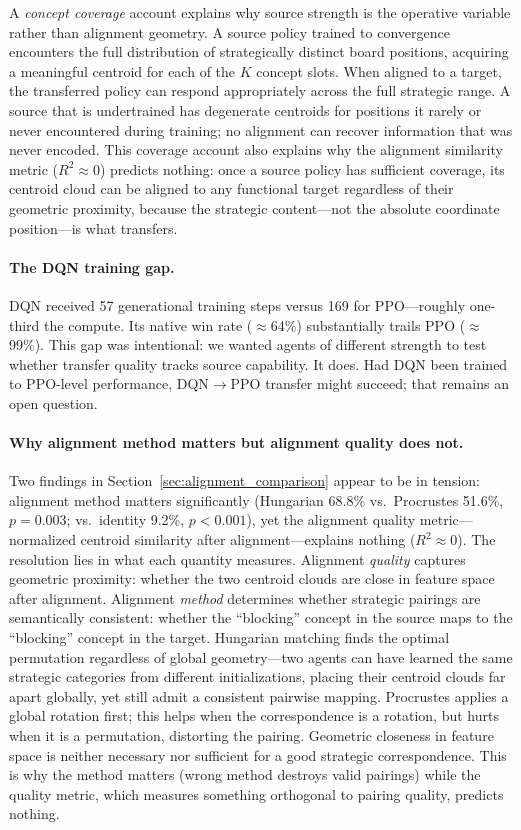 \documentclass[11pt,a4paper]{article}
\begin{document}
A \emph{concept coverage} account explains why source strength is the operative variable rather than alignment geometry. A source policy trained to convergence encounters the full distribution of strategically distinct board positions, acquiring a meaningful centroid for each of the $K$ concept slots. When aligned to a target, the transferred policy can respond appropriately across the full strategic range. A source that is undertrained has degenerate centroids for positions it rarely or never encountered during training; no alignment can recover information that was never encoded. This coverage account also explains why the alignment similarity metric ($R^2 \approx 0$) predicts nothing: once a source policy has sufficient coverage, its centroid cloud can be aligned to any functional target regardless of their geometric proximity, because the strategic content---not the absolute coordinate position---is what transfers.

\paragraph{The DQN training gap.}
DQN received 57 generational training steps versus 169 for PPO---roughly one-third the compute. Its native win rate ($\approx$64\%) substantially trails PPO ($\approx$99\%). This gap was intentional: we wanted agents of different strength to test whether transfer quality tracks source capability. It does. Had DQN been trained to PPO-level performance, DQN$\to$PPO transfer might succeed; that remains an open question.

\paragraph{Why alignment method matters but alignment quality does not.}
Two findings in Section~\ref{sec:alignment_comparison} appear to be in tension: alignment method matters significantly (Hungarian 68.8\% vs.\ Procrustes 51.6\%, $p=0.003$; vs.\ identity 9.2\%, $p<0.001$), yet the alignment quality metric---normalized centroid similarity after alignment---explains nothing ($R^2 \approx 0$). The resolution lies in what each quantity measures. Alignment \emph{quality} captures geometric proximity: whether the two centroid clouds are close in feature space after alignment. Alignment \emph{method} determines whether strategic pairings are semantically consistent: whether the ``blocking'' concept in the source maps to the ``blocking'' concept in the target. Hungarian matching finds the optimal permutation regardless of global geometry---two agents can have learned the same strategic categories from different initializations, placing their centroid clouds far apart globally, yet still admit a consistent pairwise mapping. Procrustes applies a global rotation first; this helps when the correspondence is a rotation, but hurts when it is a permutation, distorting the pairing. Geometric closeness in feature space is neither necessary nor sufficient for a good strategic correspondence. This is why the method matters (wrong method destroys valid pairings) while the quality metric, which measures something orthogonal to pairing quality, predicts nothing.
\end{document}
